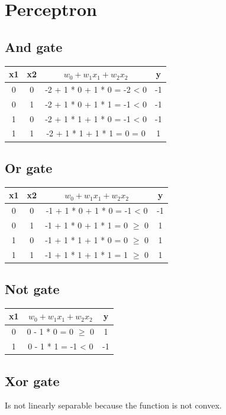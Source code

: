 \section{Perceptron}
\subsection{And gate}
\begin{tabular}{c | c | c | c}
	x1 & x2 & $w_{0}+ w_{1}x_{1}+ w_{2}x_{2}$ & y  \\
	\hline
	0  & 0  & -2 + 1 * 0 + 1 * 0 = -2 < 0     & -1 \\
	\hline
	0  & 1  & -2 + 1 * 0 + 1 * 1 = -1 < 0     & -1 \\
	\hline
	1  & 0  & -2 + 1 * 1 + 1 * 0 = -1 < 0     & -1 \\
	\hline
	1  & 1  & -2 + 1 * 1 + 1 * 1 = 0 = 0      & 1  \\
\end{tabular}

\subsection{Or gate}
\begin{tabular}{c | c | c | c}
	x1 & x2 & $w_{0}+ w_{1}x_{1}+ w_{2}x_{2}$ & y  \\
	\hline
	0  & 0  & -1 + 1 * 0 + 1 * 0 = -1 < 0     & -1 \\
	\hline
	0  & 1  & -1 + 1 * 0 + 1 * 1 = 0 $\geq$ 0 & 1  \\
	\hline
	1  & 0  & -1 + 1 * 1 + 1 * 0 = 0 $\geq$ 0 & 1  \\
	\hline
	1  & 1  & -1 + 1 * 1 + 1 * 1 = 1 $\geq$ 0 & 1  \\
\end{tabular}

\subsection{Not gate}
\begin{tabular}{c | c | c}
	x1 & $w_{0}+ w_{1}x_{1}+ w_{2}x_{2}$ & y  \\
	\hline
	0  & 0 - 1 * 0 = 0 $\geq$ 0          & 1  \\
	\hline
	1  & 0 - 1 * 1 = -1 < 0              & -1 \\
\end{tabular}

\subsection{Xor gate}
Is not linearly separable because the function is not convex.

